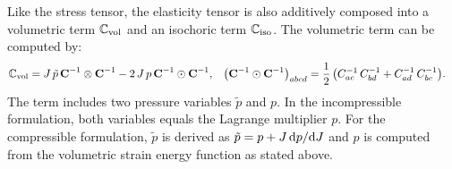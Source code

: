 Like the stress tensor, the elasticity tensor is also additively composed into a volumetric term $\mathbb{C}_\text{vol}$ and an isochoric term $\mathbb{C}_\text{iso}$. The volumetric term can be computed by:%
\begin{align*}
  \mathbb{C}_\text{vol} &= J\,\tilde{p}\,\textbf{C}^{-1} \otimes \textbf{C}^{-1} - 2\,J\,p\,\textbf{C}^{-1} \odot \textbf{C}^{-1}, &
  \big(\textbf{C}^{-1} \odot \textbf{C}^{-1}\big)_{abcd} &= \displaystyle\frac{\displaystyle{1}}{\displaystyle{2}}\,\big(C^{-1}_{ac}\,C^{-1}_{bd} + C^{-1}_{ad}\,C^{-1}_{bc}\big).
\end{align*}
The term includes two pressure variables $\tilde{p}$ and $p$. In the incompressible formulation, both variables equals the Lagrange multiplier $p$. For the compressible formulation, $\tilde{p}$ is derived as $\tilde{p} = p + J\,\d p/\d J$ and $p$ is computed from the volumetric strain energy function as stated above.


